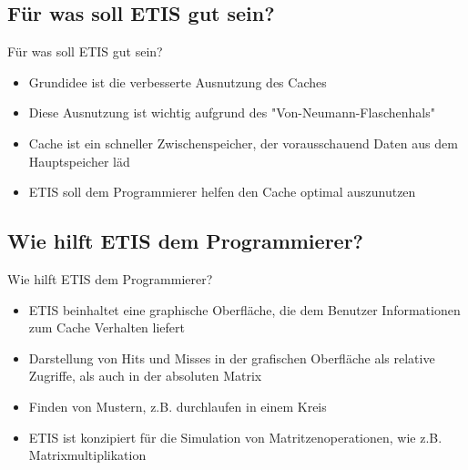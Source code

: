 \subsection{Für was soll ETIS gut sein?}
\begin{frame}
\begin{block}{Für was soll ETIS gut sein?}
\begin{itemize}[<+->]
\pause\item Grundidee ist die verbesserte Ausnutzung des Caches
\item Diese Ausnutzung ist wichtig aufgrund des "Von-Neumann-Flaschenhals"
\item Cache ist ein schneller Zwischenspeicher, der vorausschauend Daten aus dem Hauptspeicher läd
\item ETIS soll dem Programmierer helfen den Cache optimal auszunutzen
\end{itemize}
\end{block}
\end{frame}

\subsection{Wie hilft ETIS dem Programmierer?}
\begin{frame}
\begin{block}{Wie hilft ETIS dem Programmierer?}
\begin{itemize}[<+->]
\pause\item ETIS beinhaltet eine graphische Oberfläche, die dem Benutzer Informationen zum Cache Verhalten liefert
\item Darstellung von Hits und Misses in der grafischen Oberfläche als relative Zugriffe, als auch in der absoluten Matrix
\item Finden von Mustern, z.B. durchlaufen in einem Kreis
\item ETIS ist konzipiert für die Simulation von Matritzenoperationen, wie z.B. Matrixmultiplikation
\end{itemize}
\end{block}
\end{frame}

